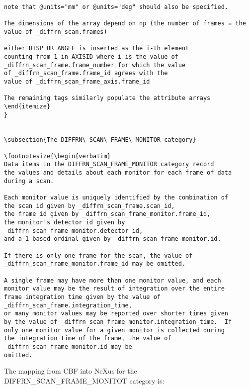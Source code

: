 \documentclass[11pt]{article}
\begin{document}
{{{\begin{verbatim}
note that @units="mm" or @units="deg" should also be specified.

The dimensions of the array depend on np (the number of frames = the
value of _diffrn_scan.frames)

either DISP OR ANGLE is inserted as the i-th element
counting from 1 in AXISID where i is the value of
_diffrn_scan_frame.frame_number for which the value
of _diffrn_scan_frame.frame_id agrees with the
value of _diffrn_scan_frame_axis.frame_id

The remaining tags similarly populate the attribute arrays
\end{itemize}
}


\subsection{The DIFFRN\_SCAN\_FRAME\_MONITOR category}

\footnotesize{\begin{verbatim}
Data items in the DIFFRN_SCAN_FRAME_MONITOR category record
the values and details about each monitor for each frame of data
during a scan.

Each monitor value is uniquely identified by the combination of
the scan id given by _diffrn_scan_frame.scan_id,
the frame id given by _diffrn_scan_frame_monitor.frame_id,
the monitor's detector id given by 
_diffrn_scan_frame_monitor.detector_id,
and a 1-based ordinal given by _diffrn_scan_frame_monitor.id.

If there is only one frame for the scan, the value of
_diffrn_scan_frame_monitor.frame_id may be omitted.

A single frame may have more than one monitor value, and each 
monitor value may be the result of integration over the entire
frame integration time given by the value of
_diffrn_scan_frame.integration_time,
or many monitor values may be reported over shorter times given 
by the value of _diffrn_scan_frame_monitor.integration_time.  If 
only one monitor value for a given monitor is collected during 
the integration time of the frame, the value of
_diffrn_scan_frame_monitor.id may be
omitted.
\end{verbatim}

The mapping from CBF into NeXus for the DIFFRN\_SCAN\_FRAME\_MONITOT category is:

}}}
\end{document}
